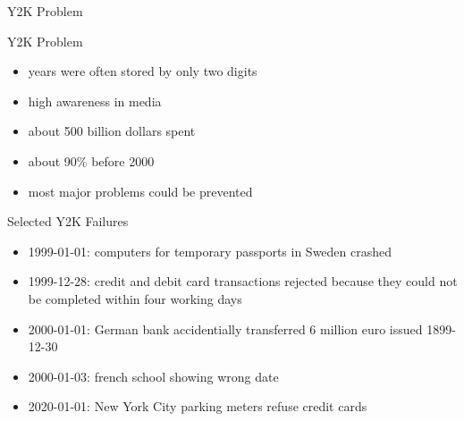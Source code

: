 \begin{frame}{Y2K Problem }
	\begin{fancycolumns}[b]
		\begin{definition}{Y2K Problem}
			\begin{itemize}
				\item years were often stored by only two digits
				\item high awareness in media
				\item about 500 billion dollars spent
				\item about 90\% before 2000
				\item most major problems could be prevented
			\end{itemize}
		\end{definition}
		\centering{}
	\nextcolumn
		\vspace{-15mm}
		
		\begin{example}{Selected Y2K Failures}
			\begin{itemize}
				\item<4-> 1999-01-01: computers for temporary passports in Sweden crashed
				\item<5-> 1999-12-28: credit and debit card transactions rejected because they could not be completed within four working days
				\item<2-> 2000-01-01: German bank accidentially transferred 6 million euro issued 1899-12-30
				\item<3-> 2000-01-03: french school showing wrong date
				\item<6-> 2020-01-01: New York City parking meters refuse credit cards
			\end{itemize}
		\end{example}
	\end{fancycolumns}
\end{frame}

